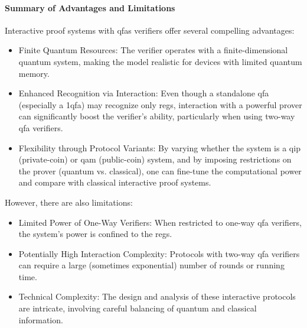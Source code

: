 \paragraph{Summary of Advantages and Limitations}
Interactive proof systems with \glspl{qfa} verifiers offer several compelling advantages:
\begin{itemize}
  \item Finite Quantum Resources: The verifier operates with a finite-dimensional quantum system, making the model realistic for devices with limited quantum memory.
  \item Enhanced Recognition via Interaction: Even though a standalone qfa (especially a 1qfa) may recognize only \glspl{reg}, interaction with a powerful prover can significantly boost the verifier's ability, particularly when using two-way qfa verifiers.
  \item Flexibility through Protocol Variants: By varying whether the system is a \gls{qip} (private-coin) or \gls{qam} (public-coin) system, and by imposing restrictions on the prover (quantum vs. classical), one can fine-tune the computational power and compare with classical interactive proof systems.
\end{itemize}
However, there are also limitations:
\begin{itemize}
  \item {Limited Power of One-Way Verifiers:} When restricted to one-way qfa verifiers, the system's power is confined to the \glspl{reg}.
  \item {Potentially High Interaction Complexity:} Protocols with two-way qfa verifiers can require a large (sometimes exponential) number of rounds or running time.
  \item {Technical Complexity:} The design and analysis of these interactive protocols are intricate, involving careful balancing of quantum and classical information.
\end{itemize}

